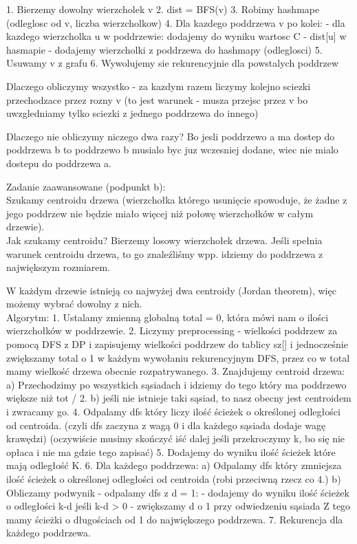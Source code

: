 \documentclass[12pt]{article}
\begin{document}
1. Bierzemy dowolny wierzcholek v
2. dist = BFS(v)
3. Robimy hashmape (odleglosc od v, liczba wierzcholkow)
4. Dla kazdego poddrzewa v po kolei:
 - dla kazdego wierzcholka u w poddrzewie:
	dodajemy do wyniku wartosc C - dist[u] w hasmapie 
 - dodajemy wierzcholki z poddrzewa do hashmapy (odleglosci)
5. Usuwamy v z grafu 
6. Wywolujemy sie rekurencyjnie dla powstalych poddrzew 

Dlaczego obliczymy wszystko - za kazdym razem liczymy kolejno sciezki przechodzace przez rozny v (to jest warunek - musza przejsc przez v bo uwzgledniamy tylko sciezki z jednego poddrzewa do innego)

Dlaczego nie obliczymy niczego dwa razy? Bo jesli poddrzewo a ma dostep do poddrzewa b to poddrzewo b musialo byc juz wczesniej dodane, wiec nie mialo dostepu do poddrzewa a.

Zadanie zaawansowane (podpunkt b):\\

Szukamy centroidu drzewa (wierzchołka którego usunięcie spowoduje, że żadne z jego poddrzew nie będzie miało więcej niż połowę wierzchołków w całym drzewie).\\

Jak szukamy centroidu?
Bierzemy losowy wierzchołek drzewa. Jeśli spełnia warunek centroidu drzewa, to go znaleźliśmy wpp. idziemy do poddrzewa z największym rozmiarem.

W każdym drzewie istnieją co najwyżej dwa centroidy (Jordan theorem), więc możemy wybrać dowolny z nich.\\ 

Algorytm:
1. Ustalamy zmienną globalną total = 0, która mówi nam o ilości wierzchołków w poddrzewie.
2. Liczymy preprocessing - wielkości poddrzew za pomocą DFS z DP i zapisujemy wielkości poddrzew do tablicy sz[] i jednocześnie zwiększamy total o 1 w każdym wywołaniu rekurencyjnym DFS, przez co w total mamy wielkość drzewa obecnie rozpatrywanego.
3. Znajdujemy centroid drzewa:
a) Przechodzimy po wszystkich sąsiadach i idziemy do tego który ma poddrzewo większe niż tot / 2.
b) jeśli nie istnieje taki sąsiad, to nasz obecny jest centroidem i zwracamy go. 
4. Odpalamy dfs który liczy ilość ścieżek o określonej odległości od centroida. (czyli dfs zaczyna z wagą 0 i dla każdego sąsiada dodaje wagę krawędzi) (oczywiście musimy skończyć iść dalej jeśli przekroczymy k, bo się nie opłaca i nie ma gdzie tego zapisać)
5. Dodajemy do wyniku ilość ścieżek które mają odległość K.
6. Dla każdego poddrzewa:
a) Odpalamy dfs który zmniejsza ilość ścieżek o określonej odległości od centroida (robi przeciwną rzecz co 4.) 
b) Obliczamy podwynik - odpalamy dfs z d = 1:
- dodajemy do wyniku ilość ścieżek o odległości k-d jeśli k-d > 0 
- zwiększamy d o 1 przy odwiedzeniu sąsiada
Z tego mamy ścieżki o długościach od 1 do największego poddrzewa. 
7. Rekurencja dla każdego poddrzewa.
\end{document}
